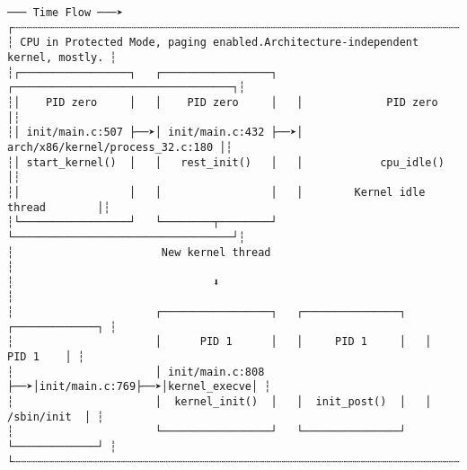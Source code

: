 \documentclass[varwidth=100em]{standalone}
\begin{document}
\begin{verbatim}
─── Time Flow ───➤
┌┄┄┄┄┄┄┄┄┄┄┄┄┄┄┄┄┄┄┄┄┄┄┄┄┄┄┄┄┄┄┄┄┄┄┄┄┄┄┄┄┄┄┄┄┄┄┄┄┄┄┄┄┄┄┄┄┄┄┄┄┄┄┄┄┄┄┄┄┄┄┄┄┄┄┄┄┄┄┄┄┐
┆ CPU in Protected Mode, paging enabled.Architecture-independent kernel, mostly. ┆
┆┌─────────────────┐   ┌─────────────────┐   ┌──────────────────────────────────┐┆
┆│    PID zero     │   │    PID zero     │   │             PID zero             │┆
┆│ init/main.c:507 ├──➤│ init/main.c:432 ├──➤│ arch/x86/kernel/process_32.c:180 │┆
┆│ start_kernel()  │   │   rest_init()   │   │            cpu_idle()            │┆
┆│                 │   │                 │   │        Kernel idle thread        │┆
┆└─────────────────┘   └────────┬────────┘   └──────────────────────────────────┘┆
┆                       New kernel thread                                        ┆
┆                               ⬇                                                ┆
┆                      ┌─────────────────┐   ┌───────────────┐   ┌─────────────┐ ┆
┆                      │      PID 1      │   │     PID 1     │   │    PID 1    │ ┆
┆                      │ init/main.c:808 ├──➤│init/main.c:769├──➤│kernel_execve│ ┆
┆                      │  kernel_init()  │   │  init_post()  │   │ /sbin/init  │ ┆
┆                      └─────────────────┘   └───────────────┘   └─────────────┘ ┆
└┄┄┄┄┄┄┄┄┄┄┄┄┄┄┄┄┄┄┄┄┄┄┄┄┄┄┄┄┄┄┄┄┄┄┄┄┄┄┄┄┄┄┄┄┄┄┄┄┄┄┄┄┄┄┄┄┄┄┄┄┄┄┄┄┄┄┄┄┄┄┄┄┄┄┄┄┄┄┄┄┘
\end{verbatim}
\end{document}
